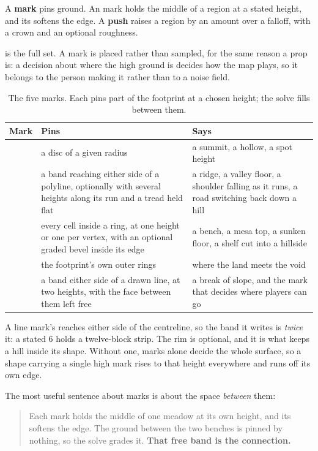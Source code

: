 A \textbf{mark} pins ground. An  mark holds the middle of a region at a
stated height, and its  softens the edge. A \textbf{push} raises a region
by an amount over a falloff, with a crown and an optional roughness.

 is the full set. A mark is placed rather than sampled, for the
same reason a prop is: a decision about where the high ground is decides how the map
plays, so it belongs to the person making it rather than to a noise field.

\begin{table}[htbp]
\caption{The five marks. Each pins part of the footprint at a chosen height; the
solve fills between them.}
\label{tab:marks}
\small
\begin{tabularx}{\textwidth}{L{1.7cm} L{5.2cm} Y}
\toprule
\textbf{Mark} & \textbf{Pins} & \textbf{Says} \\
\midrule
{} & a disc of a given radius & a summit, a hollow, a spot height \\
 & a band reaching  either side of a polyline, optionally with
  several heights along its run and a tread held flat &
  a ridge, a valley floor, a shoulder falling as it runs, a road switching back
  down a hill \\
 & every cell inside a ring, at one height or one per vertex, with an
  optional graded bevel inside its edge &
  a bench, a mesa top, a sunken floor, a shelf cut into a hillside \\
 & the footprint's own outer rings & where the land meets the void \\
 & a band either side of a drawn line, at two heights, with the face
  between them left free &
  a break of slope, and the mark that decides where players can go \\
\bottomrule
\end{tabularx}
\end{table}

A line mark's  reaches either side of the centreline, so the band it writes is
\emph{twice} it: a stated 6 holds a twelve-block strip. The rim is optional, and it
is what keeps a hill inside its shape. Without one, marks alone decide the whole
surface, so a shape carrying a single high mark rises to that height everywhere and
runs off its own edge.

The most useful sentence about marks is about the space \emph{between} them:

\begin{quote}
Each  mark holds the middle of one meadow at its own height, and its
 softens the edge. The ground between the two benches is pinned by
nothing, so the solve grades it. \textbf{That free band is the connection.}
\end{quote}

